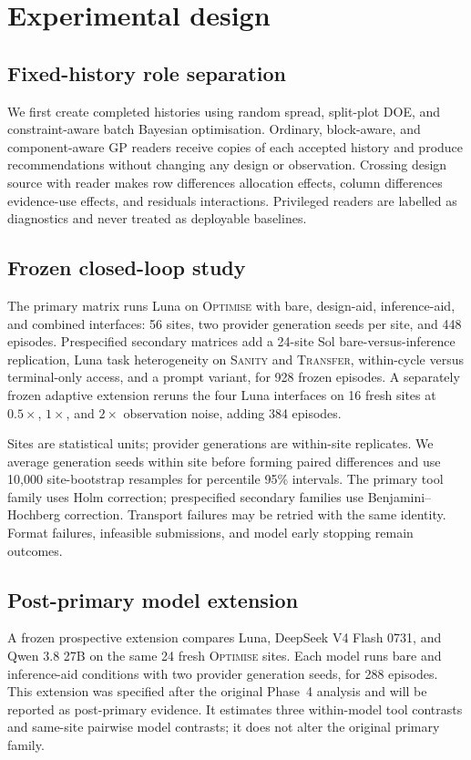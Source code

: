 \section{Experimental design}
\label{sec:experiments}

\subsection{Fixed-history role separation}
We first create completed histories using random spread, split-plot DOE, and
constraint-aware batch Bayesian optimisation. Ordinary, block-aware, and component-aware GP
readers receive copies of each accepted history and produce recommendations without changing
any design or observation. Crossing design source with reader makes row differences
allocation effects, column differences evidence-use effects, and residuals interactions.
Privileged readers are labelled as diagnostics and never treated as deployable baselines.

\subsection{Frozen closed-loop study}
The primary matrix runs Luna on \textsc{Optimise} with bare, design-aid, inference-aid, and
combined interfaces: 56 sites, two provider generation seeds per site, and 448 episodes.
Prespecified secondary matrices add a 24-site Sol bare-versus-inference replication, Luna
task heterogeneity on \textsc{Sanity} and \textsc{Transfer}, within-cycle versus
terminal-only access, and a prompt variant, for 928 frozen episodes. A separately frozen
adaptive extension reruns the four Luna interfaces on 16 fresh sites at $0.5\times$,
$1\times$, and $2\times$ observation noise, adding 384 episodes.

Sites are statistical units; provider generations are within-site replicates. We average
generation seeds within site before forming paired differences and use 10,000 site-bootstrap
resamples for percentile 95\% intervals. The primary tool family uses Holm correction;
prespecified secondary families use Benjamini--Hochberg correction. Transport failures may
be retried with the same identity. Format failures, infeasible submissions, and model early
stopping remain outcomes.

\subsection{Post-primary model extension}
A frozen prospective extension compares Luna, DeepSeek V4 Flash 0731, and Qwen 3.8 27B on
the same 24 fresh \textsc{Optimise} sites. Each model runs bare and inference-aid conditions
with two provider generation seeds, for 288 episodes. This extension was specified after the
original Phase~4 analysis and will be reported as post-primary evidence. It estimates three
within-model tool contrasts and same-site pairwise model contrasts; it does not alter the
original primary family.
